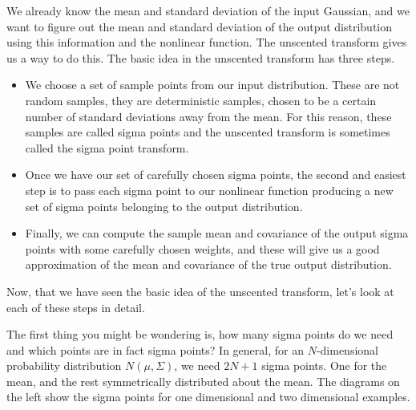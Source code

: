 We already know the mean and standard deviation of the input Gaussian, and we want to figure out the mean and
standard deviation of the output distribution using this information and
the nonlinear function. The unscented transform
gives us a way to do this. The basic idea in the unscented
transform has three steps. 

\begin{itemize}
\item We choose a set of sample points from our input distribution. These are not random samples,
they are deterministic samples, chosen to be a certain number of standard deviations away from the mean. For this reason,
these samples are called sigma points and the unscented transform is sometimes
called the sigma point transform. 
\item Once we have our set of carefully chosen sigma points, the second and easiest step is to pass each sigma point
to our nonlinear function producing a new set of sigma points belonging to the output distribution. 
\item Finally, we can compute the sample mean and covariance of the output sigma points with some carefully chosen weights, and
these will give us a good approximation of the mean and covariance of the true output distribution. 
\end{itemize}

Now, that we have seen the basic
idea of the unscented transform, let's look at each of these steps in detail. 

The first thing you might be wondering is, how many sigma points do we need and which points are in fact sigma points? In general, for
an $N$-dimensional probability distribution $N(\mu, \Sigma)$, we need $2N + 1$ sigma points. One for the mean, and the rest
symmetrically distributed about the mean. The diagrams on the left show the sigma
points for one dimensional and two dimensional examples. 

